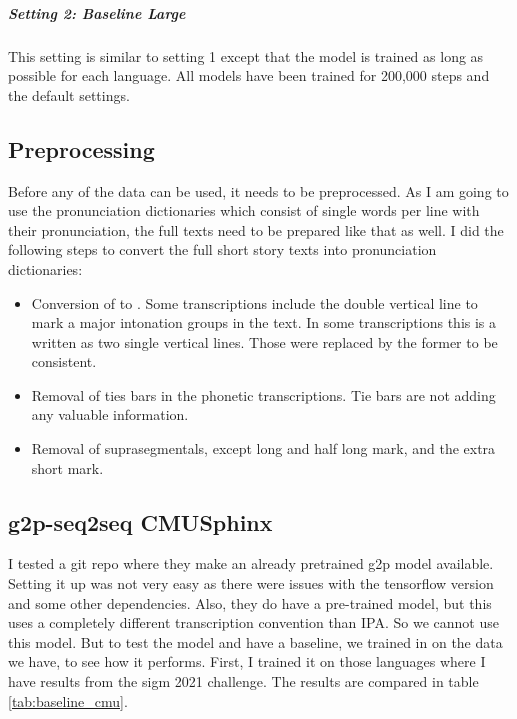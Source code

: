 \subparagraph{Setting 2: Baseline Large}
This setting is similar to setting 1 except that the model is trained as long as possible for each language. All models have been trained for 200,000 steps and the default settings. 

\subsection{Preprocessing}
Before any of the data can be used, it needs to be preprocessed. As I am going to use the pronunciation dictionaries which consist of single words per line with their pronunciation, the full texts need to be prepared like that as well. I did the following steps to convert the full short story texts into pronunciation dictionaries:

\begin{itemize}
\item Conversion of \textipa{\textvertline   \textvertline} to \textipa{\textdoublevertline}. Some transcriptions include the double vertical line to mark a major intonation groups in the text. In some transcriptions this is a written as two single vertical lines. Those were replaced by the former to be consistent. 
\item Removal of ties bars in the phonetic transcriptions. Tie bars are not adding any valuable information. 
\item Removal of suprasegmentals, except long and half long mark, and the extra short mark. 
\end{itemize}

\subsection{g2p-seq2seq CMUSphinx}
I tested a git repo where they make an already pretrained \ac{g2p} model available. Setting it up was not very easy as there were issues with the tensorflow version and some other dependencies. Also, they do have a pre-trained model, but this uses a completely different transcription convention than IPA. So we cannot use this model. But to test the model and have a baseline, we trained in on the data we have, to see how it performs. First, I trained it on those languages where I have results from the \ac{sigm} 2021 challenge. The results are compared in table \ref{tab:baseline_cmu}. 

